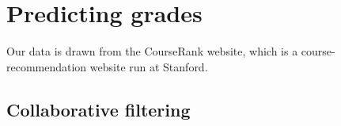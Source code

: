 \documentclass{article} %
\begin{document}
\section{Predicting grades}
Our data is drawn from the CourseRank website, which is a course-recommendation website run at Stanford.




\subsection{Collaborative filtering}









%
\end{document}
